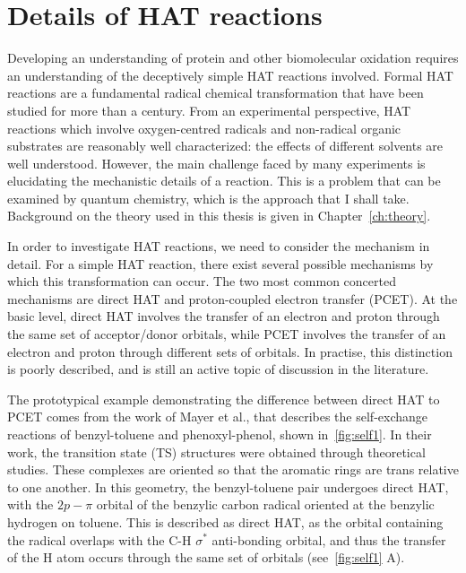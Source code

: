 \section{Details of HAT reactions}

Developing an understanding of protein and other biomolecular oxidation requires
an understanding of the deceptively simple HAT reactions involved. Formal HAT
reactions are a fundamental radical chemical transformation that have been
studied for more than a century.\cite{Kochi1973, Parsons2000} From an
experimental perspective, HAT reactions which involve oxygen-centred radicals
and non-radical organic substrates are reasonably well characterized: the
effects of different solvents are well understood.\cite{Litwinienko2007}
However, the main challenge faced by many experiments is elucidating the
mechanistic details of a reaction. This is a problem that can be examined by
quantum chemistry, which is the approach that I shall take. Background on the
theory used in this thesis is given in Chapter~\ref{ch:theory}.

In order to investigate HAT reactions, we need to consider the mechanism in
detail. For a simple HAT reaction, there exist several possible mechanisms by
which this transformation can occur. The two most common concerted mechanisms
are direct HAT and proton-coupled electron transfer (PCET). At the basic level,
direct HAT involves the transfer of an electron and proton through the same set
of acceptor/donor orbitals, while PCET involves the transfer of an electron and
proton through different sets of orbitals. In practise, this distinction is
poorly described, and is still an active topic of discussion in the
literature.\cite{Cukier1998, Mayer2002, Stubbe2003, Mayer2004, DiLabio2007,
Huynh2007, HammesSchiffer2008, Mayer2010, Weinberg2012, HammesSchiffer2015,
MunozRugeles2017}

The prototypical example demonstrating the difference between direct HAT to PCET
comes from the work of Mayer et al.,\cite{Mayer2002} that describes the
self-exchange reactions of benzyl-toluene and phenoxyl-phenol, shown
in~\ref{fig:self1}. In their work, the transition state (TS) structures were
obtained through theoretical studies. These complexes are oriented so that the
aromatic rings are trans relative to one another. In this geometry, the
benzyl-toluene pair undergoes direct HAT, with the $2p-\pi$ orbital of the
benzylic carbon radical oriented at the benzylic hydrogen on toluene. This is
described as direct HAT, as the orbital containing the radical overlaps with the
C-H $\sigma^*$ anti-bonding orbital, and thus the transfer of the H atom occurs
through the same set of orbitals (see~\ref{fig:self1} A).

